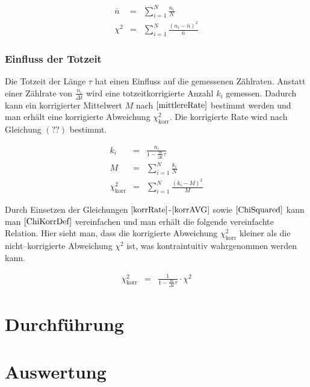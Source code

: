 \documentclass[12pt,a4paper]{scrartcl}
\numberwithin{equation}{section} %
\renewcommand{\[}{} %
\renewcommand{\]}{\noindent} %
\begin{document}
\[
\begin{eqnarray}
    \bar n &=& \sum_{i=1}^N \frac{n_i}{N} \label{mittlereRate} \\
    \chi^2 &=& \sum_{i=1}^N \frac{(n_i-\bar n)^2}{\bar n} \label{ChiSquared}
\end{eqnarray}
\]

\hypertarget{einfluss-der-totzeit}{%
\subsubsection{Einfluss der Totzeit}\label{einfluss-der-totzeit}}

Die Totzeit der Länge \(\tau\) hat einen Einfluss auf die gemessenen
Zählraten. Anstatt einer Zählrate von \(\frac{n_i}{\Delta t}\) wird eine
totzeitkorrigierte Anzahl \(k_i\) gemessen. Dadurch kann ein
korrigierter Mittelwert \(M\) nach \(\eqref{mittlereRate}\) bestimmt
werden und man erhält eine korrigierte Abweichung
\(\chi^2_\mathrm{korr}\). Die korrigierte Rate wird nach Gleichung
\((??)\) bestimmt.

\[
\begin{eqnarray}
    k_i &=&
        \frac{
            n_i
        }{
            1 - \frac{m}{\Delta t}\tau
        } \label{korrRate} \\
    M &=& \sum_{i=1}^N \frac{k_i}{N} \label{korrAVG} \\
    \chi^2_\mathrm{korr} &=& \sum_{i=1}^N
        \frac{(k_i - M)^2}{M} \label{ChiKorrDef}
\end{eqnarray}
\]

Durch Einsetzen der Gleichungen \(\eqref{korrRate}\)-\(\eqref{korrAVG}\)
sowie \(\eqref{ChiSquared}\) kann man \(\eqref{ChiKorrDef}\)
vereinfachen und man erhält die folgende vereinfachte Relation. Hier
sieht man, dass die korrigierte Abweichung \(\chi^2_\mathrm{korr}\)
kleiner als die nicht--korrigierte Abweichung \(\chi^2\) ist, was
kontraintuitiv wahrgenommen werden kann.

\[
\begin{eqnarray}
    \chi^2_\mathrm{korr} &=&
        \frac{1}{1 - \frac{m}{\Delta t}\tau} \cdot \chi^2
\end{eqnarray}
\]

\clearpage
\hypertarget{durchfuxfchrung}{%
\section{Durchführung}\label{durchfuxfchrung}}

\clearpage
\hypertarget{auswertung}{%
\section{Auswertung}\label{auswertung}}
\end{document}
